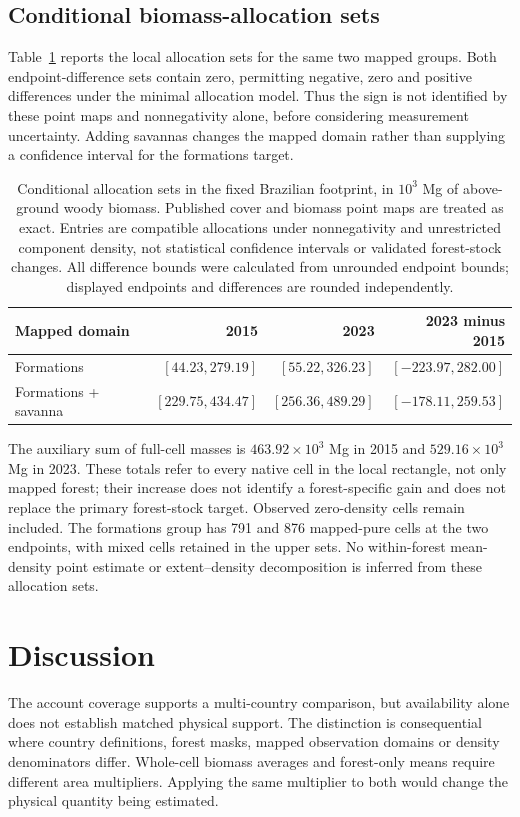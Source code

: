 \documentclass[11pt,a4paper]{article}
\begin{document}
\subsection{Conditional biomass-allocation sets}
Table~\ref{tab:allocation} reports the local allocation sets for the same two mapped groups. Both endpoint-difference sets contain zero, permitting negative, zero and positive differences under the minimal allocation model. Thus the sign is not identified by these point maps and nonnegativity alone, before considering measurement uncertainty. Adding savannas changes the mapped domain rather than supplying a confidence interval for the formations target.

\begin{table}[htbp]
\centering\small
\caption{Conditional allocation sets in the fixed Brazilian footprint, in $10^3$ Mg of above-ground woody biomass. Published cover and biomass point maps are treated as exact. Entries are compatible allocations under nonnegativity and unrestricted component density, not statistical confidence intervals or validated forest-stock changes. All difference bounds were calculated from unrounded endpoint bounds; displayed endpoints and differences are rounded independently.}\label{tab:allocation}
\begin{tabular}{lrrr}
\toprule
Mapped domain & 2015 & 2023 & 2023 minus 2015\\\midrule
Formations & $[44.23, 279.19]$ & $[55.22, 326.23]$ & $[-223.97, 282.00]$ \\
Formations + savanna & $[229.75, 434.47]$ & $[256.36, 489.29]$ & $[-178.11, 259.53]$ \\
\bottomrule
\end{tabular}
\end{table}

The auxiliary sum of full-cell masses is $463.92\times10^3$ Mg in 2015 and $529.16\times10^3$ Mg in 2023. These totals refer to every native cell in the local rectangle, not only mapped forest; their increase does not identify a forest-specific gain and does not replace the primary forest-stock target. Observed zero-density cells remain included. The formations group has 791 and 876 mapped-pure cells at the two endpoints, with mixed cells retained in the upper sets. No within-forest mean-density point estimate or extent--density decomposition is inferred from these allocation sets.



\section{Discussion}
The account coverage supports a multi-country comparison, but availability alone does not establish matched physical support. The distinction is consequential where country definitions, forest masks, mapped observation domains or density denominators differ. Whole-cell biomass averages and forest-only means require different area multipliers. Applying the same multiplier to both would change the physical quantity being estimated.
\end{document}
